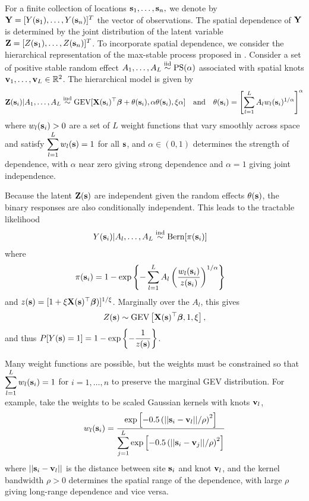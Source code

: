 For a finite collection of locations $\mathbf{s}_1, \ldots, \mathbf{s}_n,$ we denote by $\mathbf{Y} = [Y(\mathbf{s}_1), \ldots, Y(\mathbf{s}_n)]^T$ the vector of observations.
The spatial dependence of $\mathbf{Y}$ is determined by the joint distribution of the latent variable $\mathbf{Z} = [Z(\mathbf{s}_1),\ldots, Z(\mathbf{s}_n)]^T$.
To incorporate spatial dependence, we consider the hierarchical representation of the max-stable process proposed in \citet{Reich2012}.
Consider a set of positive stable random effect $A_1, \ldots, A_L \stackrel{\mathrm{iid}}{\sim} \text{PS}(\alpha)$ associated with spatial knots $\mathbf{v}_1, \ldots, \mathbf{v}_L \in \mathbb{R}^2$.
The hierarchical model is given by
\begin{align} \label{rbeq:hiermodel}
  \mathbf{Z}(\mathbf{s}_i) | A_1, \ldots, A_L \stackrel{\mathrm{ind}}{\sim} \text{GEV}[\mathbf{X}(\mathbf{s}_i)^\top \mbox{\boldmath $\beta$} + \theta(\mathbf{s}_i), \alpha \theta(\mathbf{s}_i), \xi \alpha] \quad \text{and} \quad \theta(\mathbf{s}_i) = \left[\sum_{l = 1}^L A_l w_l (\mathbf{s}_i)^{1 / \alpha} \right]^\alpha
\end{align}
where $w_{l}(\mathbf{s}_i) > 0$ are a set of $L$ weight functions that vary smoothly across space and satisfy $\displaystyle \sum_{l = 1}^L w_l(\mathbf{s}) = 1$ for all $\mathbf{s}$, and $\alpha\in(0,1)$ determines the strength of dependence, with $\alpha$ near zero giving strong dependence and $\alpha=1$ giving joint independence.

Because the latent $\mathbf{Z}(\mathbf{s})$ are independent given the random effects $\theta(\mathbf{s})$, the binary responses are also conditionally independent.
This leads to the tractable likelihood
\begin{align} \label{rbeq:condlike}
  Y(\mathbf{s}_i) | A_l, \ldots, A_L &\stackrel{\mathrm{ind}}{\sim} \text{Bern}[\pi(\mathbf{s}_i)]
\end{align}
where
\begin{align} \label{rbeq:pyeq1cond}
  \pi(\mathbf{s}_i) &= 1 - \exp \left\{ -\displaystyle \sum_{ l = 1 }^{L} A_l \left( \frac{ w_{l}(\mathbf{s}_i) }{ z(\mathbf{s}_i) } \right)^{ 1/\alpha} \right\}
\end{align}
and $z(\mathbf{s}) = [1 + \xi \mathbf{X}(\mathbf{s})^\top \mbox{\boldmath $\beta$})]^{1 / \xi}$.
Marginally over the $A_l$, this gives
\begin{align}
  Z(\mathbf{s}) \sim \text{GEV}\left[\mathbf{X}(\mathbf{s})^\top \mbox{\boldmath $\beta$}, 1, \xi\right],
\end{align}
and thus $P[Y(\mathbf{s}) = 1] = 1 - \exp\left\{-\displaystyle \frac{1}{z(\mathbf{s})}\right\}$.

Many weight functions are possible, but the weights must be constrained so that $\displaystyle \sum_{l=1}^L w_{l}(\mathbf{s}_i)=1$ for $i=1,\ldots,n$ to preserve the marginal GEV distribution.
For example, \cite{Reich2012} take the weights to be scaled Gaussian kernels with knots $\mathbf{v}_l$,
\begin{align}\label{rbeq:w}
   w_{l}(\mathbf{s}_i) = \frac{\exp\left[-0.5\left(||\mathbf{s}_i-\mathbf{v}_l||/\rho\right)^2\right]}
                 {\displaystyle \sum_{j=1}^L\exp\left[-0.5\left(||\mathbf{s}_i-\mathbf{v}_j||/\rho\right)^2\right]}
\end{align}
where $||\mathbf{s}_i - \mathbf{v}_l||$ is the distance between site $\mathbf{s}_i$ and knot $\mathbf{v}_l$, and the kernel bandwidth $\rho>0$ determines the spatial range of the dependence, with large $\rho$ giving long-range dependence and vice versa.

